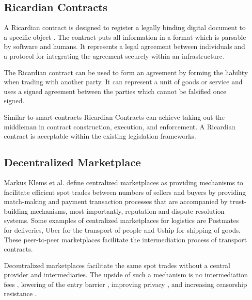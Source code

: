 \subsection{Ricardian Contracts}

A Ricardian contract is designed to register a legally binding digital document to a specific object \cite{grigg2004ricardian}. The contract puts all information in a format which is parsable by software and humans. It represents a legal agreement between individuals and a protocol for integrating the agreement securely within an infrastructure. \par
The Ricardian contract can be used to form an agreement by forming the liability when trading with another party. It can represent a unit of goods or service and uses a signed agreement between the parties which cannot be falsified once signed. \par
Similar to smart contracts \cite{buterin2014next} Ricardian Contracts can achieve taking out the middleman in contract construction, execution, and enforcement. A Ricardian contract is acceptable within the existing legislation frameworks.

\subsection{Decentralized Marketplace}

Markus Klems et al. define centralized marketplaces\cite{trustlessIntermediationInBCServiceMarket} as providing mechanisms to facilitate efficient spot trades between numbers of sellers and buyers by providing match-making and payment transaction processes that are accompanied by trust-building mechanisms, most importantly, reputation and dispute resolution systems. Some examples of centralized marketplaces for logistics are Postmates for deliveries, Uber for the transport of people and Uship for shipping of goods. These peer-to-peer marketplaces facilitate the intermediation process of transport contracts.\par
Decentralized marketplaces facilitate the same spot trades without a central provider and intermediaries. The upside of such a mechanism is no intermediation fees \cite{openbazaar}, lowering of the entry barrier \cite{einav2016peer}, improving privacy \cite{decentralizedAnonymousReputation}, and increasing censorship resistance \cite{decentralMarket}.
